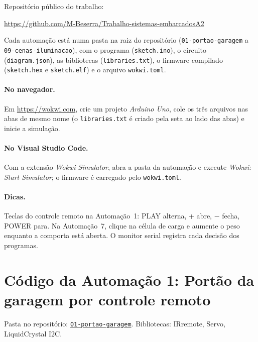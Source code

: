 \documentclass[12pt]{article}
\newcommand{\repositorio}{https://github.com/M-Beserra/Trabalho-sistemas-embarcadosA2}
\newcommand{\pasta}[1]{\href{\repositorio/tree/main/#1}{\texttt{#1}}}
\begin{document}
Repositório público do trabalho:

\begin{center}\url{https://github.com/M-Beserra/Trabalho-sistemas-embarcadosA2}\end{center}

\noindent Cada automação está numa pasta na raiz do repositório (\texttt{01-portao-garagem} a \texttt{09-cenas-iluminacao}), com o programa (\texttt{sketch.ino}), o circuito (\texttt{diagram.json}), as bibliotecas (\texttt{libraries.txt}), o firmware compilado (\texttt{sketch.hex} e \texttt{sketch.elf}) e o arquivo \texttt{wokwi.toml}.

\paragraph{No navegador.} Em \url{https://wokwi.com}, crie um projeto \emph{Arduino Uno}, cole os três arquivos nas abas de mesmo nome (o \texttt{libraries.txt} é criado pela seta ao lado das abas) e inicie a simulação.

\paragraph{No Visual Studio Code.} Com a extensão \emph{Wokwi Simulator}, abra a pasta da automação e execute \emph{Wokwi: Start Simulator}; o firmware é carregado pelo \texttt{wokwi.toml}.

\paragraph{Dicas.} Teclas do controle remoto na Automação~1: PLAY alterna, + abre, $-$ fecha, POWER para. Na Automação~7, clique na célula de carga e aumente o peso enquanto a comporta está aberta. O monitor serial registra cada decisão dos programas.

\section{Código da Automação 1: Portão da garagem por controle remoto}

\noindent Pasta no repositório: \pasta{01-portao-garagem}. Bibliotecas: IRremote, Servo, LiquidCrystal I2C.
\end{document}
